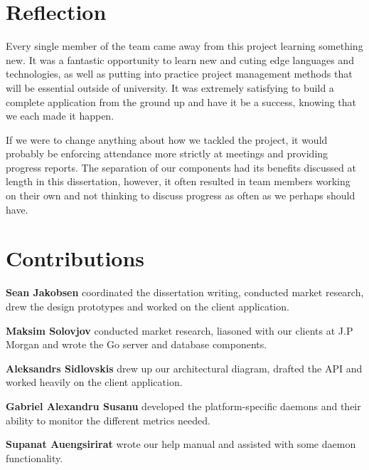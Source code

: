 \documentclass{l3proj}
\begin{document}

\section{Reflection}

Every single member of the team came away from this project learning something new. It was a fantastic opportunity to learn new and cuting edge languages and technologies, as well as putting into practice project management methods that will be essential outside of university. It was extremely satisfying to build a complete application from the ground up and have it be a success, knowing that we each made it happen.

If we were to change anything about how we tackled the project, it would probably be enforcing attendance more strictly at meetings and providing progress reports. The separation of our components had its benefits discussed at length in this dissertation, however, it often resulted in team members working on their own and not thinking to discuss progress as often as we perhaps should have.


\section{Contributions}

\textbf{Sean Jakobsen} coordinated the dissertation writing, conducted market research, drew the design prototypes and worked on the client application. 

\textbf{Maksim Solovjov} conducted market research, liasoned with our clients at J.P Morgan and wrote the Go server and database components.

\textbf{Aleksandrs Sidlovskis} drew up our architectural diagram, drafted the API and worked heavily on the client application.

\textbf{Gabriel Alexandru Susanu} developed the platform-specific daemons and their ability to monitor the different metrics needed.

\textbf{Supanat Auengsirirat} wrote our help manual and assisted with some daemon functionality.

\end{document}
